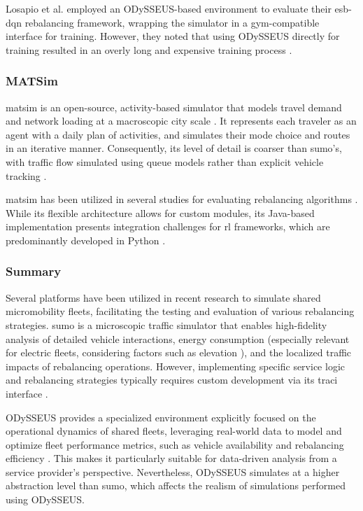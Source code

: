 Losapio et al. \cite{losapio_smart_2022} employed an ODySSEUS-based environment to evaluate their \gls{esb-dqn} rebalancing framework, wrapping the simulator in a gym-compatible interface for training.
However, they noted that using ODySSEUS directly for training resulted in an overly long and expensive training process \cite{losapio_smart_2022}.

\subsubsection{MATSim}
\gls{matsim} is an open-source, activity-based simulator that models travel demand and network loading at a macroscopic city scale \cite{horni_introducing_2016}.
It represents each traveler as an agent with a daily plan of activities, and simulates their mode choice and routes in an iterative manner.
Consequently, its level of detail is coarser than \gls{sumo}'s, with traffic flow simulated using queue models rather than explicit vehicle tracking \cite{horni_introducing_2016}.

\gls{matsim} has been utilized in several studies for evaluating rebalancing algorithms \cite{chouaki_review_2025}.
While its flexible architecture allows for custom modules, its Java-based implementation presents integration challenges for \gls{rl} frameworks, which are predominantly developed in Python \cite{horni_introducing_2016}.

\subsubsection{Summary}
Several platforms have been utilized in recent research to simulate shared micromobility fleets, facilitating the testing and evaluation of various rebalancing strategies.
\gls{sumo} is a microscopic traffic simulator that enables high-fidelity analysis of detailed vehicle interactions, energy consumption (especially relevant for electric fleets, considering factors such as elevation \cite{freymann_integrating_2024}), and the localized traffic impacts of rebalancing operations.
However, implementing specific service logic and rebalancing strategies typically requires custom development via its \gls{traci} interface \cite{alvarez_lopez_simulation_2025}.

ODySSEUS provides a specialized environment explicitly focused on the operational dynamics of shared fleets, leveraging real-world data to model and optimize fleet performance metrics, such as vehicle availability and rebalancing efficiency \cite{smartdatapolito_smartdatapolitoodysseus_2022}.
This makes it particularly suitable for data-driven analysis from a service provider's perspective.
Nevertheless, ODySSEUS simulates at a higher abstraction level than \gls{sumo}, which affects the realism of simulations performed using ODySSEUS.

